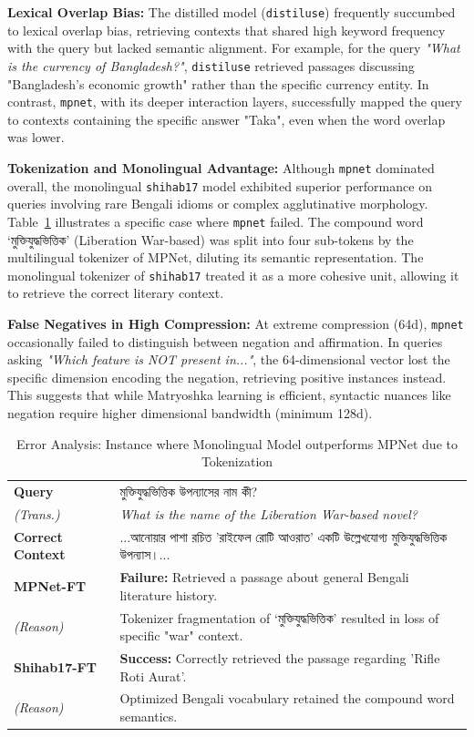 \documentclass[manuscript,screen,review]{acmart}
\newcommand{\bn}[1]{{\bengalifont #1}}
\begin{document}
\textbf{Lexical Overlap Bias:} The distilled model (\texttt{distiluse}) frequently succumbed to lexical overlap bias, retrieving contexts that shared high keyword frequency with the query but lacked semantic alignment. For example, for the query \textit{"What is the currency of Bangladesh?"}, \texttt{distiluse} retrieved passages discussing "Bangladesh's economic growth" rather than the specific currency entity. In contrast, \texttt{mpnet}, with its deeper interaction layers, successfully mapped the query to contexts containing the specific answer "Taka", even when the word overlap was lower.

\textbf{Tokenization and Monolingual Advantage:} Although \texttt{mpnet} dominated overall, the monolingual \texttt{shihab17} model exhibited superior performance on queries involving rare Bengali idioms or complex agglutinative morphology.
Table~\ref{tab:error_analysis} illustrates a specific case where \texttt{mpnet} failed. The compound word \bn{‘মুক্তিযুদ্ধভিত্তিক’} (Liberation War-based) was split into four sub-tokens by the multilingual tokenizer of MPNet, diluting its semantic representation. The monolingual tokenizer of \texttt{shihab17} treated it as a more cohesive unit, allowing it to retrieve the correct literary context.

\textbf{False Negatives in High Compression:} At extreme compression (64d), \texttt{mpnet} occasionally failed to distinguish between negation and affirmation. In queries asking \textit{"Which feature is NOT present in..."}, the 64-dimensional vector lost the specific dimension encoding the negation, retrieving positive instances instead. This suggests that while Matryoshka learning is efficient, syntactic nuances like negation require higher dimensional bandwidth (minimum 128d).

\begin{table}[h]
    \caption{Error Analysis: Instance where Monolingual Model outperforms MPNet due to Tokenization}
    \label{tab:error_analysis}
    \small
    \begin{tabularx}{\linewidth}{p{1.5cm}X}
        \toprule
        \textbf{Query} & \bn{মুক্তিযুদ্ধভিত্তিক উপন্যাসের নাম কী?} \\
        \textit{(Trans.)} & \textit{What is the name of the Liberation War-based novel?} \\
        \midrule
        \textbf{Correct Context} & ...\bn{আনোয়ার পাশা রচিত 'রাইফেল রোটি আওরাত' একটি উল্লেখযোগ্য মুক্তিযুদ্ধভিত্তিক উপন্যাস।...} \\
        \midrule
        \textbf{MPNet-FT} & \textbf{Failure:} Retrieved a passage about general Bengali literature history. \\
        \textit{(Reason)} & Tokenizer fragmentation of \bn{‘মুক্তিযুদ্ধভিত্তিক’} resulted in loss of specific "war" context. \\
        \midrule
        \textbf{Shihab17-FT} & \textbf{Success:} Correctly retrieved the passage regarding 'Rifle Roti Aurat'. \\
        \textit{(Reason)} & Optimized Bengali vocabulary retained the compound word semantics. \\
        \bottomrule
    \end{tabularx}
\end{table}
\end{document}
